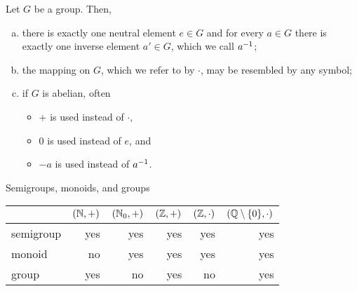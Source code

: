 \begin{rmk}
Let $G$ be a group. Then, \begin{enumerate}[(a),leftmargin=2\parindent]
    \item there is exactly one neutral element $e \in G$ and for every $a \in G$ there is exactly one inverse element $a' \in G$, which we call $a^{-1}$;
    \item the mapping on $G$, which we refer to by $\cdot$, may be resembled by any symbol;
    \item if $G$ is abelian, often \begin{itemize}
        \item $+$ is used instead of $\cdot$,
        \item $0$ is used instead of $e$, and
        \item $-a$ is used instead of $a^{-1}$.
    \end{itemize}
\end{enumerate}
\end{rmk}

\begin{ex}{Semigroups, monoids, and groups}{}
\begin{center}
\setlength\tabcolsep{5pt}
\begin{tabular}{lrrrrr}
\toprule
 & $(\mathbb{N},+)$ & $(\mathbb{N}_0,+)$ & $(\mathbb{Z},+)$ & $(\mathbb{Z},\cdot)$ & $(\mathbb{Q} \setminus \{0\},\cdot)$ \\
 \midrule
 semigroup & yes & yes & yes & yes & yes \\
 \addlinespace
 monoid & no & yes & yes & yes & yes \\
 \addlinespace
 group & yes & no & yes & no & yes \\
 \bottomrule
\end{tabular}
\end{center}
\end{ex}

